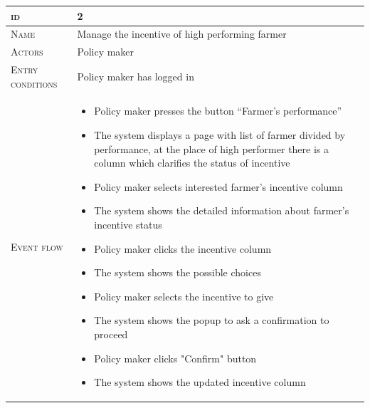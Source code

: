 \begin{table}[H]
    \centering
    \begin{tabular}{|l|p{}|}
        \hline %
    	\textsc{id}                 &   2\\
    	\hline %
    	\textsc{Name}               &   Manage the incentive of high performing farmer \\
    	\hline %
    	\textsc{Actors}             &   Policy maker\\
    	\hline %
    	\textsc{Entry conditions}   &   Policy maker has logged in\\
    	\hline %
    	\textsc{Event flow}         &   %
            	                        \begin{itemize}
                                    	    \item Policy maker presses the button “Farmer’s performance”
                                    		\item The system displays a page with list of farmer divided by performance, at the place of high performer there is a column which clarifies the status of incentive 
                                       		\item Policy maker selects interested farmer’s incentive column
                                    		\item The system shows the detailed information about farmer’s incentive status
                                    		\item Policy maker clicks the incentive column
                                    		\item The system shows the possible choices
                                    		\item Policy maker selects the incentive to give
                                    		\item The system shows the popup to ask a confirmation to proceed
                                    		\item Policy maker clicks "Confirm" button
                                    		\item The system shows the updated incentive column
                                        \end{itemize}\\

\end{tabular}
\end{table}
